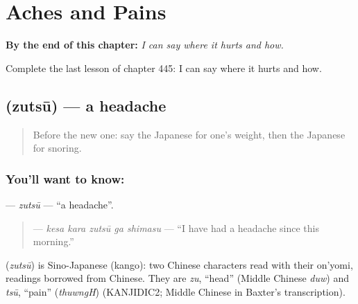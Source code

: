 
\chapter{Aches and Pains}
\label{ch:ja-aches-and-pains}

\begin{chapteropening}
\textbf{By the end of this chapter:} \emph{I can say where it hurts and how.}

Complete the last lesson of chapter 445: I can say where it hurts and how.
\end{chapteropening}

\section[\texorpdfstring{\ja{ずつう} (zutsū)}{ずつう (zutsū)}]{ (zutsū) — a headache}

\label{lesson:JA-C445-zutsuu}



\begin{quote}
Before the new one: say the Japanese for one's weight, then the Japanese for snoring.
\end{quote}

\subsection*{You'll want to know: }
\textbf{} — \emph{zutsū} — \textquotedblleft{}a headache\textquotedblright{}.

\begin{quote}
\textbf{  } — \emph{kesa kara zutsū ga shimasu} — \textquotedblleft{}I have had a headache since this morning.\textquotedblright{}
\end{quote}

\begin{cousinweb}
\textbf{} (\emph{zutsū}) is Sino-Japanese (kango): two Chinese characters read with their on'yomi, readings borrowed from Chinese. They are \emph{zu}, \textquotedblleft{}head\textquotedblright{} (Middle Chinese \emph{duw}) and \emph{tsū}, \textquotedblleft{}pain\textquotedblright{} (\emph{thuwngH}) (KANJIDIC2; Middle Chinese in Baxter's transcription).
\end{cousinweb}

